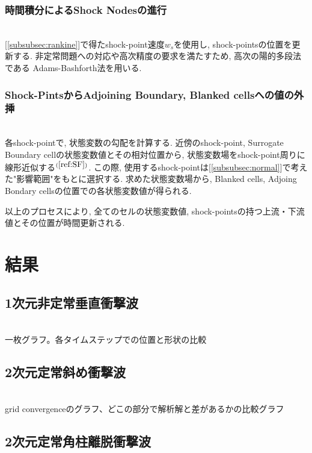 \documentclass[a4j]{jarticle}
\begin{document}
\subsubsection{時間積分によるShock Nodesの進行} \label{subsubsec:prop}
\mbox{}\\[-1.0ex]

[\ref{subsubsec:rankine}]で得たshock-point速度$w_s$を使用し, shock-pointsの位置を更新する.
非定常問題への対応や高次精度の要求を満たすため, 高次の陽的多段法である
Adams-Bashforth法を用いる.

\subsubsection{Shock-PintsからAdjoining Boundary, Blanked cellsへの値の外挿} \label{subsubsec:adjoining}
\mbox{}\\[-1.0ex]

各shock-pointで, 状態変数の勾配を計算する.
近傍のshock-point, Surrogate Boundary cellの状態変数値とその相対位置から, 
状態変数場をshock-point周りに線形近似する$^{(\ref{ref:SF})}$.
この際, 使用するshock-pointは[\ref{subsubsec:normal}]で考えた"影響範囲"をもとに選択する.
求めた状態変数場から, Blanked cells, Adjoing Bondary cellsの位置での各状態変数値が得られる.

以上のプロセスにより, 全てのセルの状態変数値, shock-pointsの持つ上流・下流値とその位置が時間更新される.

\section{結果}
\subsection{1次元非定常垂直衝撃波}\label{subsec:1D}
\mbox{}\\[-3.0ex]

一枚グラフ。各タイムステップでの位置と形状の比較

\subsection{2次元定常斜め衝撃波}\label{subsec:2Ddiag}
\mbox{}\\[-3.0ex]

grid convergenceのグラフ、どこの部分で解析解と差があるかの比較グラフ

\subsection{2次元定常角柱離脱衝撃波}\label{subsec:2Dsq}
\mbox{}\\[-3.0ex]
\end{document}
